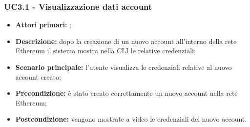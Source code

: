 \subsubsection{UC3.1 - Visualizzazione dati account}
\begin{itemize}
	\item \textbf{Attori primari:} \una{};
	\item \textbf{Descrizione:} dopo la creazione di un nuovo account all’interno della rete Ethereum il sistema mostra nella CLI le relative credenziali;
	\item \textbf{Scenario principale:} l’utente visualizza le credenziali relative al nuovo account creato;  
	\item \textbf{Precondizione:} è stato creato correttamente un nuovo account nella rete Ethereum;   
	\item \textbf{Postcondizione:}  vengono mostrate a video le credenziali del nuovo account.  
\end{itemize}